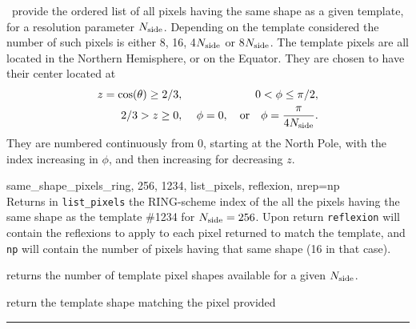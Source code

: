 \begin{codedescription}
{\thedocid\ provide the ordered list of all \healpix pixels having the same shape
  as a given template, for a resolution parameter $N_{\rm side}$. Depending on the
  template considered the number of such pixels is either 8, 16, 4$N_{\rm side}$ or
  8$N_{\rm side}$. The template pixels are all located in the Northern Hemisphere, or on the
 Equator.
They are chosen to have their center located at
\begin{eqnarray}
     z=\cos(\theta)\ge 2/3,  &\ &    0< \phi \leq \pi/2,   \nonumber\\            %
     2/3 > z \geq 0,  &\ & \phi=0, \quad{\rm or}\quad  \phi=\frac{\pi}{4\nside}.  \nonumber %
\myhtmlimage{}
\end{eqnarray}
 They are numbered continuously from 0, starting at the North Pole, with the index
 increasing in $\phi$, and then increasing for decreasing $z$.
}
\end{codedescription}


\begin{example}
{
same\_shape\_pixels\_ring, 256, 1234, list\_pixels, reflexion, nrep=np  \\
}
{
Returns in {\tt list\_pixels} the RING-scheme index of the all the pixels having
the same shape as the template \#1234 for $N_{\rm side}=256$. Upon return {\tt reflexion} will
contain the reflexions to apply to each pixel returned to match the template,
and {\tt np} will contain the number of pixels having that same shape (16 in that case).
}
\end{example}
\begin{related}
  \begin{sulist}{} %
  \item[\htmlref{nside2templates}{idl:nside2ntemplates}] returns the
  number of template pixel shapes available for a given $N_{\rm side}$.
  \item[\htmlref{template\_pixel\_ring}{idl:template_pixel_xxx}] 
  \item[\htmlref{template\_pixel\_nest}{idl:template_pixel_xxx}] 
  return
  the template shape matching the pixel provided
  \end{sulist}
\end{related}

\rule{\hsize}{2mm}

